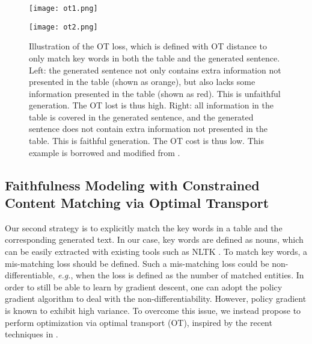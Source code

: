 \documentclass[11pt,a4paper]{article}
\begin{document}
\begin{figure*}
    \centering
    
    \begin{minipage}{0.49\linewidth}
        \texttt{[image: ot1.png]}
    \end{minipage}
    \begin{minipage}{0.49\linewidth}
        \texttt{[image: ot2.png]}
    \end{minipage}
    
    \caption{Illustration of the OT loss, which is defined with OT distance to only match key words in both the table and the generated sentence. Left: the generated sentence not only contains extra information not presented in the table (shown as orange), but also lacks some information presented in the table (shown as red).  This is unfaithful generation. The OT lost is thus high. Right: all information in the table is covered in the generated sentence, and the generated sentence does not contain extra information not presented in the table. This is faithful generation. The OT cost is thus low. This example is borrowed and modified from \cite{Dhingra2019}.}
    \label{fig:OT_loss}
    \vspace{-0.4cm}
\end{figure*}


\subsection {Faithfulness Modeling with Constrained Content Matching via Optimal Transport} \label{sec:OT}
Our second strategy is to explicitly match the key words in a table and the corresponding generated text. In our case, key words are defined as nouns, which can be easily extracted with existing tools such as NLTK \cite{loper2002}. To match key words, a mis-matching loss should be defined. Such a mis-matching loss could be non-differentiable, {\it e.g.}, when the loss is defined as the number of matched entities. In order to still be able to learn by gradient descent, one can adopt the policy gradient algorithm to deal with the non-differentiability. However, policy gradient is known to exhibit high variance. To overcome this issue, we instead propose to perform optimization via optimal transport (OT), inspired by the recent techniques in \cite{liqun2019}.
\end{document}
